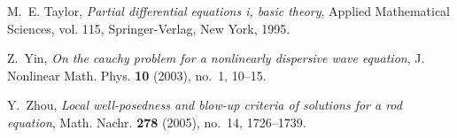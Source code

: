 \documentclass[12pt,reqno]{amsart}
\numberwithin{equation}{section}  %
\numberwithin{figure}{section}
\begin{document}
\begin{thebibliography}{HKM09}
M.~E. Taylor, \emph{Partial differential equations i, basic theory}, Applied
  Mathematical Sciences, vol. 115, Springer-Verlag, New York, 1995.

Z.~Yin, \emph{On the cauchy problem for a nonlinearly dispersive wave
  equation}, J. Nonlinear Math. Phys. \textbf{10} (2003), no.~1, 10--15.

Y.~Zhou, \emph{Local well-posedness and blow-up criteria of solutions for a rod
  equation}, Math. Nachr. \textbf{278} (2005), no.~14, 1726--1739.

\end{thebibliography}
%
%
%
%
%
%
\end{document}
